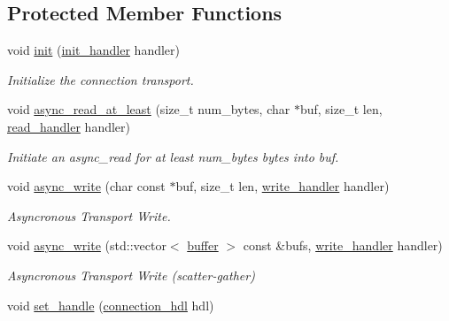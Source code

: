 \subsection*{Protected Member Functions}
\begin{DoxyCompactItemize}
\item 
void \hyperlink{classwebsocketpp_1_1transport_1_1stub_1_1connection_ae0cc258a1ca2f1a63ac3706f89bb1bb5}{init} (\hyperlink{namespacewebsocketpp_1_1transport_aeae75e675c1a334b3b33ab7120b480a5}{init\+\_\+handler} handler)
\begin{DoxyCompactList}\small\item\em Initialize the connection transport. \end{DoxyCompactList}\item 
void \hyperlink{classwebsocketpp_1_1transport_1_1stub_1_1connection_a531a99546f52fee1c34c699f9c742348}{async\+\_\+read\+\_\+at\+\_\+least} (size\+\_\+t num\+\_\+bytes, char $\ast$buf, size\+\_\+t len, \hyperlink{namespacewebsocketpp_1_1transport_a3a9b2ed54dfcc6ebe7d7e6b4c02f53fb}{read\+\_\+handler} handler)
\begin{DoxyCompactList}\small\item\em Initiate an async\+\_\+read for at least num\+\_\+bytes bytes into buf. \end{DoxyCompactList}\item 
void \hyperlink{classwebsocketpp_1_1transport_1_1stub_1_1connection_ac2e693adb10e223c76a7e5c00c00f3f2}{async\+\_\+write} (char const $\ast$buf, size\+\_\+t len, \hyperlink{namespacewebsocketpp_1_1transport_addf5d728159e7aa2bce2a0df947b1560}{write\+\_\+handler} handler)
\begin{DoxyCompactList}\small\item\em Asyncronous Transport Write. \end{DoxyCompactList}\item 
void \hyperlink{classwebsocketpp_1_1transport_1_1stub_1_1connection_a471dfa8496b2f131512626b9d8bd273f}{async\+\_\+write} (std\+::vector$<$ \hyperlink{structwebsocketpp_1_1transport_1_1buffer}{buffer} $>$ const \&bufs, \hyperlink{namespacewebsocketpp_1_1transport_addf5d728159e7aa2bce2a0df947b1560}{write\+\_\+handler} handler)
\begin{DoxyCompactList}\small\item\em Asyncronous Transport Write (scatter-\/gather) \end{DoxyCompactList}\item 
void \hyperlink{classwebsocketpp_1_1transport_1_1stub_1_1connection_a3a175c59ccb7b7ce630ab6441db8dba7}{set\+\_\+handle} (\hyperlink{namespacewebsocketpp_a6b3d26a10ee7229b84b776786332631d}{connection\+\_\+hdl} hdl)

\end{DoxyCompactItemize}
